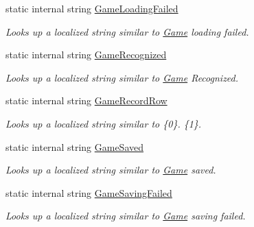 \begin{DoxyCompactItemize}
static internal string \mbox{\hyperlink{class_chess_tracking_1_1_localization_1_1_program_localization_a2ce52bd226b514a59332badcaf20dbcb}{Game\+Loading\+Failed}}
\begin{DoxyCompactList}\small\item\em Looks up a localized string similar to \mbox{\hyperlink{namespace_chess_tracking_1_1_game}{Game}} loading failed. \end{DoxyCompactList}\item 
static internal string \mbox{\hyperlink{class_chess_tracking_1_1_localization_1_1_program_localization_ac95454726c1980755bd657c763e50826}{Game\+Recognized}}
\begin{DoxyCompactList}\small\item\em Looks up a localized string similar to \mbox{\hyperlink{namespace_chess_tracking_1_1_game}{Game}} Recognized. \end{DoxyCompactList}\item 
static internal string \mbox{\hyperlink{class_chess_tracking_1_1_localization_1_1_program_localization_abef71b503e2de048420ced556282e780}{Game\+Record\+Row}}
\begin{DoxyCompactList}\small\item\em Looks up a localized string similar to \{0\}. \{1\}. \end{DoxyCompactList}\item 
static internal string \mbox{\hyperlink{class_chess_tracking_1_1_localization_1_1_program_localization_a921012fe00c1750b096b2a721e1c6cd4}{Game\+Saved}}
\begin{DoxyCompactList}\small\item\em Looks up a localized string similar to \mbox{\hyperlink{namespace_chess_tracking_1_1_game}{Game}} saved. \end{DoxyCompactList}\item 
static internal string \mbox{\hyperlink{class_chess_tracking_1_1_localization_1_1_program_localization_a681ac8708cde38081393b6d8e202023a}{Game\+Saving\+Failed}}
\begin{DoxyCompactList}\small\item\em Looks up a localized string similar to \mbox{\hyperlink{namespace_chess_tracking_1_1_game}{Game}} saving failed. \end{DoxyCompactList}\item 

\end{DoxyCompactItemize}
